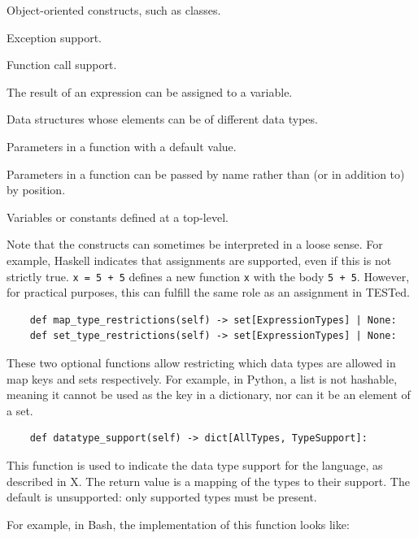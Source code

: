 \documentclass[../main]{subfiles}
\begin{document}
\begin{description}[noitemsep]
    \item[Objects] Object-oriented constructs, such as classes.
    \item[Exceptions] Exception support.
    \item[Function calls] Function call support.
    \item[Assignments] The result of an expression can be assigned to a variable.
    \item[Heterogeneous collections] Data structures whose elements can be of different data types.
    \item[Default parameters] Parameters in a function with a default value.
    \item[Named arguments] Parameters in a function can be passed by name rather than (or in addition to) by position.
    \item[Global variables] Variables or constants defined at a top-level.
\end{description}

Note that the constructs can sometimes be interpreted in a loose sense.
For example, Haskell indicates that assignments are supported, even if this is not strictly true.
\texttt{x = 5 + 5} defines a new function \texttt{x} with the body \texttt{5 + 5}.
However, for practical purposes, this can fulfill the same role as an assignment in TESTed.

\begin{verbatim}
    def map_type_restrictions(self) -> set[ExpressionTypes] | None:
    def set_type_restrictions(self) -> set[ExpressionTypes] | None:
\end{verbatim}

These two optional functions allow restricting which data types are allowed in map keys and sets respectively.
For example, in Python, a list is not hashable, meaning it cannot be used as the key in a dictionary, nor can it be an element of a set.

\begin{verbatim}
    def datatype_support(self) -> dict[AllTypes, TypeSupport]:
\end{verbatim}

This function is used to indicate the data type support for the language, as described in X.
The return value is a mapping of the types to their support.
The default is unsupported: only supported types must be present.

For example, in Bash, the implementation of this function looks like:
\end{document}
